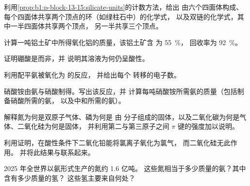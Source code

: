 \begin{exercise}[$\star\star$]\label{exo:b1:p-block-13-15:5}
利用\cref{prop:b1:p-block-13-15:silicate-units}的计数方法，给出
由六个四面体构成、每个四面体共享两个顶点的环（如绿柱石中）的化学式，
以及双链的化学式，其中一半四面体共享两个顶点，
另一半共享三个顶点。
\end{exercise}

\begin{exercise}[$\star\star$]\label{exo:b1:p-block-13-15:6}
计算一吨铝土矿中所得氧化铝的质量，该铝土矿含
 为 \qty{55}{\percent}，
回收率为 \qty{92}{\percent}。
\end{exercise}

\begin{exercise}[$\star\star$]\label{exo:b1:p-block-13-15:7}
证明硼酸是而非，并
说明其溶液为何仍呈酸性。
\end{exercise}

\begin{exercise}[$\star\star$]\label{exo:b1:p-block-13-15:8}
利用配平氨被氧化为  的反应，
并给出每个  转移的电子数。
\end{exercise}

\begin{exercise}[$\star\star$]\label{exo:b1:p-block-13-15:9}
硝酸铵由氨与硝酸制得。写出该反应，并
计算每吨硝酸铵所需氨的质量（包括制备硝酸所需的氨，
以及中和所需的氨）。
\end{exercise}

\begin{exercise}[$\star\star\star$]\label{exo:b1:p-block-13-15:10}
解释氮为何是双原子气体、磷为何是
由  分子组成的固体，以及二氧化碳为何是气体、二氧化硅为何是固体，
并利用第二与第三原子之间 $\pi$ 键的强度加以说明。
\end{exercise}

\begin{exercise}[$\star\star\star$]\label{exo:b1:p-block-13-15:11}
利用证明，在酸性条件下二氧化铅能将氯离子氧化为氯气，
而二氧化硅无此作用。
并将此结果与联系起来。
\end{exercise}

\begin{exercise}[$\star\star\star$]\label{exo:b1:p-block-13-15:12}
2025 年全世界以氨形式生产的氮约 1.6 亿吨。
这些氮相当于多少质量的氨？其中含有多少质量的氢？
这些氢主要来自何处？
\end{exercise}

